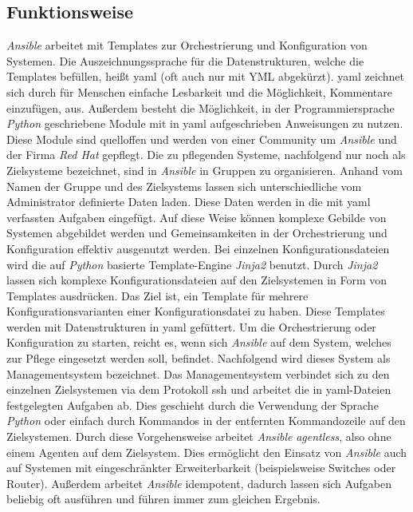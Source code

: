 \documentclass[titlepage]{report}
\begin{document}
\subsection*{Funktionsweise}
\emph{Ansible} arbeitet mit Templates zur Orchestrierung und
Konfiguration von Systemen. Die Auszeichnungssprache für die
Datenstrukturen, welche die Templates befüllen, heißt \gls{yaml} (oft
auch nur mit YML abgekürzt). \gls{yaml} zeichnet sich durch für Menschen
einfache Lesbarkeit und die Möglichkeit, Kommentare einzufügen,
aus\cite{YAML_WIKI}. Außerdem besteht die Möglichkeit, in der
Programmiersprache \emph{Python} geschriebene Module mit in \gls{yaml}
aufgeschrieben Anweisungen zu nutzen. Diese Module sind quelloffen und
werden von einer Community um \emph{Ansible} und der Firma \emph{Red
Hat} gepflegt. Die zu pflegenden Systeme, nachfolgend nur noch als
Zielsysteme bezeichnet, sind in \emph{Ansible} in Gruppen zu
organisieren. Anhand vom Namen der Gruppe und des Zielsystems lassen
sich unterschiedliche vom Administrator definierte Daten laden. Diese
Daten werden in die mit \gls{yaml} verfassten Aufgaben eingefügt.
Auf diese Weise können komplexe Gebilde von Systemen abgebildet werden
und Gemeinsamkeiten in der Orchestrierung und Konfiguration effektiv ausgenutzt werden.
Bei einzelnen Konfigurationsdateien wird die auf \emph{Python} basierte Template\hyp{}Engine
\emph{Jinja2} benutzt\cite{JINJA2}. Durch \emph{Jinja2} lassen sich komplexe
Konfigurationsdateien auf den Zielsystemen in Form von Templates
ausdrücken. Das Ziel ist, ein Template für mehrere
Konfigurationsvarianten einer Konfigurationsdatei zu haben. Diese
Templates werden mit Datenstrukturen in \gls{yaml} gefüttert.
Um die Orchestrierung oder Konfiguration zu starten, reicht es, wenn sich
\emph{Ansible} auf dem System, welches zur Pflege eingesetzt werden
soll, befindet. Nachfolgend wird dieses System als Managementsystem
bezeichnet. Das Managementsystem verbindet sich zu den einzelnen
Zielsystemen via dem Protokoll \gls{ssh} und arbeitet die in
\gls{yaml}\hyp{}Dateien festgelegten Aufgaben ab. Dies geschieht durch
die Verwendung der Sprache \emph{Python} oder einfach durch Kommandos in
der entfernten Kommandozeile auf den Zielsystemen. Durch
diese Vorgehensweise arbeitet \emph{Ansible} \emph{agentless}, also ohne
einem Agenten auf dem Zielsystem. Dies
ermöglicht den Einsatz von \emph{Ansible} auch auf Systemen mit
eingeschränkter Erweiterbarkeit (beispielsweise Switches oder Router).
Außerdem arbeitet \emph{Ansible} idempotent, dadurch lassen sich
Aufgaben beliebig oft ausführen und führen immer zum gleichen Ergebnis.
\end{document}

